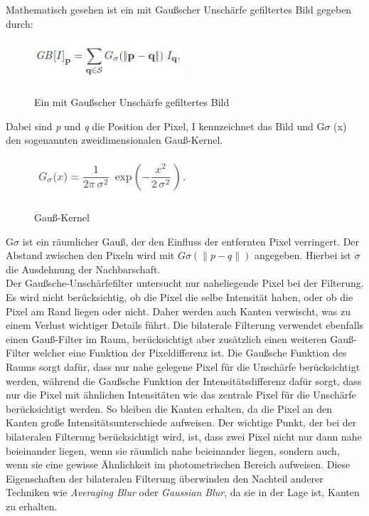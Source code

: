 Mathematisch gesehen ist ein mit Gaußscher Unschärfe gefiltertes Bild gegeben durch:
\begin{figure}[H]
    \centering
    \includegraphics[width=0.5\textwidth]{pics/GBFilteredPic.jpeg}
    \caption{Ein mit Gaußscher Unschärfe gefiltertes Bild}
    \cite{GBfilteredPicture}
    \label{fig:anpr_2}
    \end{figure}
Dabei sind \textit{p} und \textit{q} die Position der Pixel, I kennzeichnet das Bild und G\(\sigma\) (x) den sogenannten zweidimensionalen Gauß-Kernel. 
\begin{figure}[H]
    \centering
    \includegraphics[width=0.5\textwidth]{pics/Gaussian-Filter-Formula-2.jpeg}
    \caption{Gauß-Kernel}
    \cite{GBfilteredPicture2}
    \label{fig:anpr_3}
    \end{figure}
    G\(\sigma\) ist ein räumlicher Gauß, der den Einfluss der entfernten Pixel verringert. Der Abstand zwischen den Pixeln wird mit \(G\sigma(\|p-q\|)\) angegeben. Hierbei ist \(\sigma\) die Ausdehnung der Nachbarschaft.\\
    Der Gaußsche-Unschärfefilter untersucht nur naheliegende Pixel bei der Filterung. Es wird nicht berücksichtig, ob die Pixel die selbe Intensität haben, oder ob die Pixel am Rand liegen oder nicht. Daher werden auch Kanten verwischt, was zu einem Verlust wichtiger Details führt. Die bilaterale Filterung verwendet ebenfalls einen Gauß-Filter im Raum, berücksichtigt aber zusätzlich einen weiteren Gauß-Filter welcher eine Funktion der Pixeldifferenz ist. Die Gaußsche Funktion des Raums sorgt dafür, dass nur nahe gelegene Pixel für die Unschärfe berücksichtigt werden, während die Gaußsche Funktion der Intensitätsdifferenz dafür sorgt, dass nur die Pixel mit ähnlichen Intensitäten wie das zentrale Pixel für die Unschärfe berücksichtigt werden. So bleiben die Kanten erhalten, da die Pixel an den Kanten große Intensitätsunterschiede aufweisen.
    Der wichtige Punkt, der bei der bilateralen Filterung berücksichtigt wird, ist, dass zwei Pixel nicht nur dann nahe beieinander liegen, wenn sie räumlich nahe beieinander liegen, sondern auch, wenn sie eine gewisse Ähnlichkeit im photometrischen Bereich aufweisen. Diese Eigenschaften der bilateralen Filterung überwinden den Nachteil anderer Techniken wie \textit{Averaging Blur} oder \textit{Gaussian Blur}, da sie in der Lage ist, Kanten zu erhalten.\\
